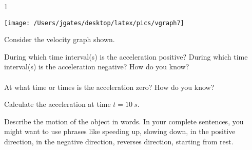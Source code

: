 
\AddToShipoutPicture*{\BackgroundPic}

\addtocounter {ProbNum} {1}

\begin{floatingfigure}[r]{.44\textwidth}
\texttt{[image: /Users/jgates/desktop/latex/pics/vgraph7]}
\end{floatingfigure}
 
{\bf \Large{}} Consider the velocity graph shown.
\bigskip

During which time interval(s) is the acceleration positive?  During which time interval(s) is the acceleration negative?  How do you know? \paragraph{}
\noindent
\vfill

At what time or times is the acceleration zero?  How do you know?
\vfill

Calculate the acceleration at time $t = 10~s$.
\vfill

Describe the motion of the object in words.  In your complete sentences, you might want to use phrases like speeding up, slowing down, in the positive direction, in the negative direction, reverses direction, starting from rest. 
\vfill


\newpage
